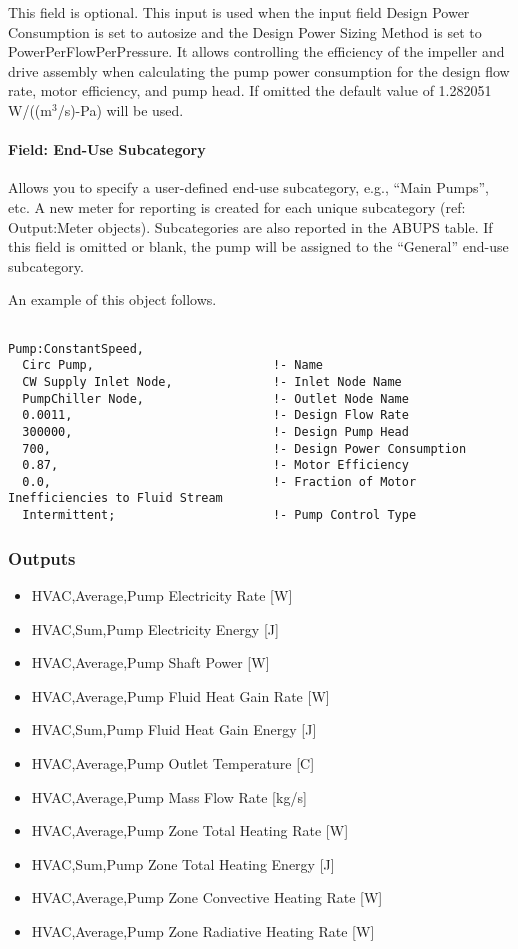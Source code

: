 This field is optional. This input is used when the input field Design Power Consumption is set to autosize and the Design Power Sizing Method is set to PowerPerFlowPerPressure. It allows controlling the efficiency of the impeller and drive assembly when calculating the pump power consumption for the design flow rate, motor efficiency, and pump head. If omitted the default value of 1.282051 W/((m\(^{3}\)/s)-Pa) will be used.

\paragraph{Field: End-Use Subcategory}\label{field-end-use-subcategory-2-000}

Allows you to specify a user-defined end-use subcategory, e.g., ``Main Pumps'', etc. A new meter for reporting is created for each unique subcategory (ref: Output:Meter objects). Subcategories are also reported in the ABUPS table. If this field is omitted or blank, the pump will be assigned to the ``General'' end-use subcategory.

An example of this object follows.

\begin{lstlisting}

Pump:ConstantSpeed,
  Circ Pump,                         !- Name
  CW Supply Inlet Node,              !- Inlet Node Name
  PumpChiller Node,                  !- Outlet Node Name
  0.0011,                            !- Design Flow Rate
  300000,                            !- Design Pump Head
  700,                               !- Design Power Consumption
  0.87,                              !- Motor Efficiency
  0.0,                               !- Fraction of Motor Inefficiencies to Fluid Stream
  Intermittent;                      !- Pump Control Type
\end{lstlisting}

\subsubsection{Outputs}\label{outputs-1-020}

\begin{itemize}
\item
  HVAC,Average,Pump Electricity Rate {[}W{]}
\item
  HVAC,Sum,Pump Electricity Energy {[}J{]}
\item
  HVAC,Average,Pump Shaft Power {[}W{]}
\item
  HVAC,Average,Pump Fluid Heat Gain Rate {[}W{]}
\item
  HVAC,Sum,Pump Fluid Heat Gain Energy {[}J{]}
\item
  HVAC,Average,Pump Outlet Temperature {[}C{]}
\item
  HVAC,Average,Pump Mass Flow Rate {[}kg/s{]}
\item
  HVAC,Average,Pump Zone Total Heating Rate {[}W{]}
\item
  HVAC,Sum,Pump Zone Total Heating Energy {[}J{]}
\item
  HVAC,Average,Pump Zone Convective Heating Rate {[}W{]}
\item
  HVAC,Average,Pump Zone Radiative Heating Rate {[}W{]}
\end{itemize}

